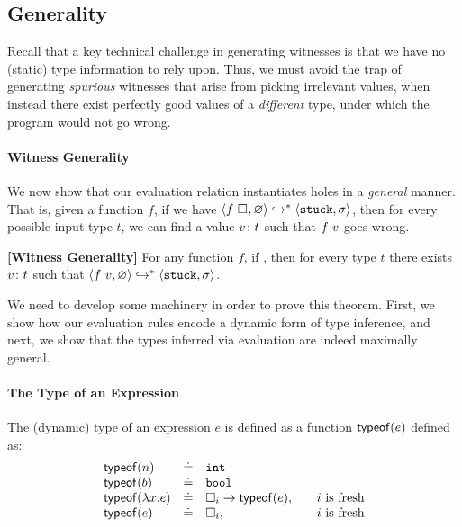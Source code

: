\subsection{Generality}\label{sec:soundness}

Recall that a key technical challenge in generating witnesses is
that we have no (static) type information to rely upon. Thus, we
must avoid the trap of generating \emph{spurious} witnesses that
arise from picking irrelevant values, when instead there exist
perfectly good values of a \emph{different} type, under which
the program would not go wrong.

\paragraph{Witness Generality}
We now show that our evaluation relation instantiates holes in a
\emph{general} manner. That is, given a function $f$, if we have
$\langle f \ \square_{}, \varnothing \rangle \hookrightarrow^{*} \langle \mathtt{stuck}, \sigma \rangle$, then for every
possible input type $t$, we can find a value ${v} \colon {t}$
such that $f \ v$ goes wrong.

\begin{thm}{\textbf{[Witness Generality]}}
\label{thm:soundness}
  For any function $f$, if ,
  then for every type $t$ there exists ${v} \colon {t}$ such that
  $\langle f \ v, \varnothing \rangle \hookrightarrow^{*} \langle \mathtt{stuck}, \sigma \rangle$.
\end{thm}

We need to develop some machinery in order to prove this theorem.
First, we show how our evaluation rules encode a dynamic form of
type inference, and next, we show that the types inferred via
evaluation are indeed maximally general.

\paragraph{The Type of an Expression} The (dynamic) type of an
expression $e$ is defined as a function $\mathsf{typeof}(e)$ defined as:
  \[
  \begin{array}{lcll}
    \mathsf{typeof}(n)   & \doteq & \mathtt{int} & \\
    \mathsf{typeof}(b)   & \doteq & \mathtt{bool} & \\
    \mathsf{typeof}(\lambda x. e) & \doteq & {\square_{i}} \rightarrow \mathsf{typeof}(e), & \quad \text{$i$ is fresh} \\
    \mathsf{typeof}(e) & \doteq & \square_{i}, & \quad \text{$i$ is fresh} \\
  \end{array}
  \]

